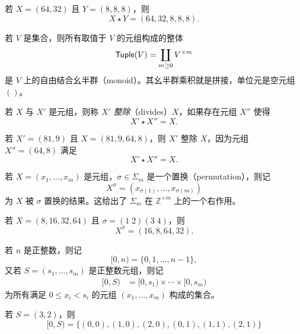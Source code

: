 \begin{example}
    若 $X = (64,32)$ 且 $Y = (8,8,8)$，则
    \[
    X \star Y = (64,32,8,8,8).
    \]
\end{example}

\begin{remark}
    若 $V$ 是集合，则所有取值于 $V$ 的元组构成的整体
    \[\mathsf{Tuple}(V) = \coprod_{m \geq 0} V^{\times m}\]
    是 $V$ 上的自由结合幺半群（monoid）。其幺半群乘积就是拼接，单位元是空元组 $()$。
\end{remark}

\begin{definition}\label{definitionofdivisibilityoftuples}
若 $X$ 与 $X'$ 是元组，则称 $X'$ {\it 整除}（divides）$X$，如果存在元组 $X''$ 使得
\[
X' \star X'' = X.
\]
\end{definition}

\begin{example}
    若 $X' = (81,9)$ 且 $X = (81,9,64,8)$，则 $X'$ 整除 $X$，因为元组 $X'' = (64,8)$ 满足
    \[
    X' \star X'' = X.
    \]
\end{example}
\begin{definition} 若 $X=(x_1,\dots,x_m)$ 是元组，$\sigma \in \Sigma_m$ 是一个置换（permutation），则记
\[
X^\sigma = (x_{\sigma(1)},\dots,x_{\sigma(m)})
\]
为 $X$ 被 $\sigma$ 置换的结果。这给出了 $\Sigma_m$ 在 $\mathbb{Z}^{\times m}$ 上的一个右作用。
\end{definition}

\begin{example}
    若 $X = (8,16,32,64)$ 且 $\sigma = (1 \; 2)(3 \; 4)$，则
    \[
    X^\sigma = (16,8,64,32).
    \]
\end{example}

\begin{notation}
若 $n$ 是正整数，则记
\[
[0,n) = \{ 0,1,\dots,n-1\},
\]
又若 $S = (s_1,\dots,s_m)$ 是正整数元组，则记
\begin{align*}
[0,S) &  = [0,s_1) \times \cdots \times [0,s_m)
\end{align*}
为所有满足 $0 \leq x_i < s_i$ 的元组 $(x_1,\dots,x_m)$ 构成的集合。
\end{notation}

\begin{example}
    若 $S = (3,2)$，则
    \[
    [0,S) = \{(0,0),(1,0),(2,0),(0,1),(1,1),(2,1) \}
    \]
\end{example}

